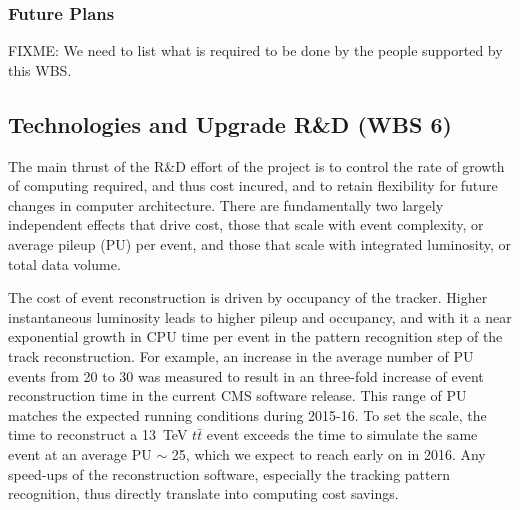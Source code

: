 \documentclass[11pt,a4paper]{article}
\begin{document}

\subsubsection{Future Plans}

{FIXME: We need to list what is required to be done by the people
  supported by this WBS.}

\subsection{Technologies and Upgrade R\&D (WBS 6)}

The main thrust of the R\&D effort of the project is to control the
rate of growth of computing required, and thus cost incured, and to retain
flexibility for future changes in computer architecture.  
There are fundamentally two largely independent effects that drive cost,
those that scale with event complexity, or average pileup (PU) per event, 
and those that scale with integrated luminosity, or total data volume.

The cost of event reconstruction is driven by occupancy of the tracker.
Higher instantaneous luminosity leads to higher pileup and occupancy, and
with it a near exponential growth in CPU time per event in the pattern
recognition step of the track reconstruction.  For example, an increase in
the average number of PU events from 20 to 30 was measured to result in an
three-fold increase of event reconstruction time in the current CMS software
release.  This range of PU matches the expected running conditions during
2015-16.  To set the scale, the time to reconstruct a 13~TeV $t\bar{t}$ event
exceeds the time to simulate the same event at an average PU $\sim$ 25,
which we expect to reach early on in 2016.  Any speed-ups of the
reconstruction software, especially the tracking pattern recognition, thus
directly translate into computing cost savings.
\end{document}
